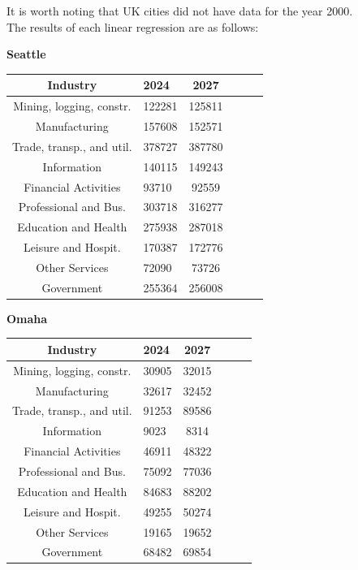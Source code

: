 \documentclass{article}
\begin{document}
It is worth noting that UK cities did not have data for the year 2000. \\
The results of each linear regression are as follows: \\
\begin{table}[h]
\centering
\textbf{Seattle} \\
\begin{tabularx}{210pt}{|c|X|c|X|c|X|}
    \hline
    \textbf{Industry} & \textbf{2024} & \textbf{2027} \\
    \hline
    Mining, logging, constr. & 122281 & 125811 \\
    \hline
    Manufacturing & 157608 & 152571 \\
    \hline
    Trade, transp., and util. & 378727 & 387780 \\
    \hline
    Information & 140115 & 149243  \\
    \hline
    Financial Activities & 93710 & 92559 \\
    \hline
    Professional and Bus. & 303718 & 316277 \\
    \hline
    Education and Health & 275938 & 287018 \\
    \hline
    Leisure and Hospit. & 170387 & 172776 \\
    \hline
    Other Services & 72090 & 73726 \\
    \hline
    Government & 255364 & 256008\\
    \hline
\end{tabularx}
\end{table}
\begin{table}[h]
\centering
\textbf{Omaha} \\
\begin{tabularx}{210pt}{|c|X|c|X|c|X|}
    \hline
    \textbf{Industry} & \textbf{2024} & \textbf{2027} \\
    \hline
    Mining, logging, constr. & 30905 & 32015 \\
    \hline
    Manufacturing & 32617 & 32452 \\
    \hline
    Trade, transp., and util. & 91253 & 89586 \\
    \hline
    Information & 9023 & 8314  \\
    \hline
    Financial Activities & 46911 & 48322 \\
    \hline
    Professional and Bus. & 75092 & 77036 \\
    \hline
    Education and Health & 84683 & 88202 \\
    \hline
    Leisure and Hospit. & 49255 & 50274 \\
    \hline
    Other Services & 19165 & 19652 \\
    \hline
    Government & 68482 & 69854 \\
    \hline
\end{tabularx}
\end{table}
\end{document}
